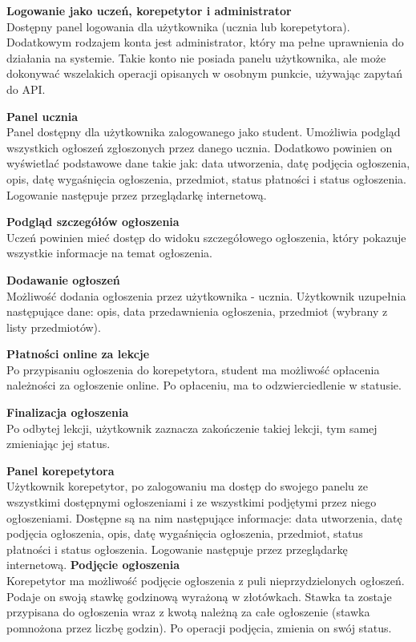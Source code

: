 \documentclass[12pt]{article}
\numberwithin{figure}{section}
\begin{document}
\begin{sloppypar}
\noindent
\textbf{Logowanie jako uczeń, korepetytor i administrator}\\
\indent  
Dostępny panel logowania dla użytkownika (ucznia lub korepetytora). Dodatkowym rodzajem konta jest administrator, który ma pełne uprawnienia do działania na systemie. Takie konto nie posiada panelu użytkownika, ale może dokonywać wszelakich operacji opisanych w osobnym punkcie, używając zapytań do API.

\noindent
\textbf{Panel ucznia}\\
\indent
Panel dostępny dla użytkownika zalogowanego jako student. Umożliwia podgląd wszystkich ogłoszeń zgłoszonych przez danego ucznia. Dodatkowo powinien on wyświetlać podstawowe dane takie jak: data utworzenia, datę podjęcia ogłoszenia, opis, datę wygaśnięcia ogłoszenia, przedmiot, status płatności i status ogłoszenia. Logowanie następuje przez przeglądarkę internetową. 

\noindent
\textbf{Podgląd szczegółów ogłoszenia}\\
\indent
Uczeń powinien mieć dostęp do widoku szczegółowego ogłoszenia, który pokazuje wszystkie informacje na temat ogłoszenia.

\noindent
\textbf{Dodawanie ogłoszeń}\\
\indent
Możliwość dodania ogłoszenia przez użytkownika - ucznia. Użytkownik uzupełnia następujące dane: opis, data przedawnienia ogłoszenia, przedmiot (wybrany z listy przedmiotów). 

\noindent
\textbf{Płatności online za lekcje}\\
\indent
Po przypisaniu ogłoszenia do korepetytora, student ma możliwość opłacenia należności za ogłoszenie online. Po opłaceniu, ma to odzwierciedlenie w statusie. 

\noindent
\textbf{Finalizacja ogłoszenia}\\
\indent
Po odbytej lekcji, użytkownik zaznacza zakończenie takiej lekcji, tym samej zmieniając jej status.

\noindent
\textbf{Panel korepetytora}\\
\indent
Użytkownik korepetytor, po zalogowaniu ma dostęp do swojego panelu ze wszystkimi dostępnymi ogłoszeniami i ze wszystkimi podjętymi przez niego ogłoszeniami. Dostępne są na nim następujące informacje: data utworzenia, datę podjęcia ogłoszenia, opis, datę wygaśnięcia ogłoszenia, przedmiot, status płatności i status ogłoszenia. Logowanie następuje przez przeglądarkę internetową. 
\clearpage
\noindent
\textbf{Podjęcie ogłoszenia}\\
\indent
Korepetytor ma możliwość podjęcie ogłoszenia z puli nieprzydzielonych ogłoszeń. Podaje on swoją stawkę godzinową wyrażoną w złotówkach. Stawka ta zostaje przypisana do ogłoszenia wraz z kwotą należną za całe ogłoszenie (stawka pomnożona przez liczbę godzin). Po operacji podjęcia, zmienia on swój status.


\end{sloppypar}
\end{document}
